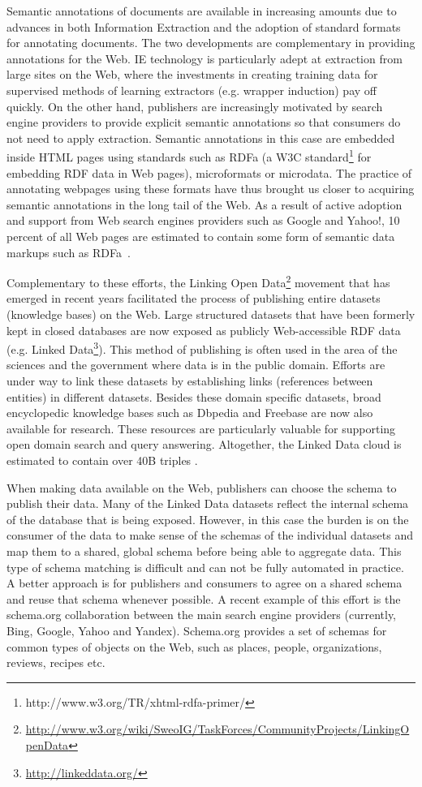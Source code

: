 Semantic annotations of documents are available in increasing amounts due to advances in both Information Extraction and the adoption of standard formats for annotating documents. The two developments are complementary in providing annotations for the Web. IE technology is particularly adept at extraction from large sites on the Web, where the investments in creating training data for supervised methods of learning extractors (e.g. wrapper induction) pay off quickly. On the other hand, publishers are increasingly motivated by search engine providers to provide explicit semantic annotations so that consumers do not need to apply extraction. Semantic annotations in this case are embedded inside HTML pages using standards such as RDFa (a W3C standard\footnote{http://www.w3.org/TR/xhtml-rdfa-primer/} for embedding RDF data in Web pages), microformats or microdata. The practice of annotating webpages using these formats have thus brought us closer to acquiring semantic annotations in the long tail of the Web. As a result of active adoption and support from Web search engines providers such as Google and Yahoo!, 10 percent of all Web pages are estimated to contain some form of semantic data markups such as RDFa~\cite{}. 

Complementary to these efforts, the Linking Open Data\footnote{\url{http://www.w3.org/wiki/SweoIG/TaskForces/CommunityProjects/LinkingOpenData}} movement that has emerged in recent years facilitated the process of publishing entire datasets (knowledge bases) on the Web. Large structured datasets that have been formerly kept in closed databases are now exposed as publicly Web-accessible RDF data (e.g. Linked Data\footnote{\url{http://linkeddata.org/}}). This method of publishing is often used in the area of the sciences and the government where data is in the public domain. Efforts are under way to link these datasets by establishing links (references between entities) in different datasets. Besides these domain specific datasets, broad encyclopedic knowledge bases such as Dbpedia and Freebase are now also available for research. These resources are particularly valuable for supporting open domain search and query answering. Altogether, the Linked Data cloud is estimated to contain over 40B triples \cite{}.

When making data available on the Web, publishers can choose the schema to publish their data. Many of the Linked Data datasets reflect the internal schema of the database that is being exposed. However, in this case the burden is on the consumer of the data to make sense of the schemas of the individual datasets and map them to a shared, global schema before being able to aggregate data. This type of schema matching is difficult and can not be fully automated in practice. A better approach is for publishers and consumers to agree on a shared schema and reuse that schema whenever possible. A recent example of this effort is the schema.org collaboration between the main search engine providers (currently, Bing, Google, Yahoo and Yandex). Schema.org provides a set of schemas for common types of objects on the Web, such as places, people, organizations, reviews, recipes etc.

